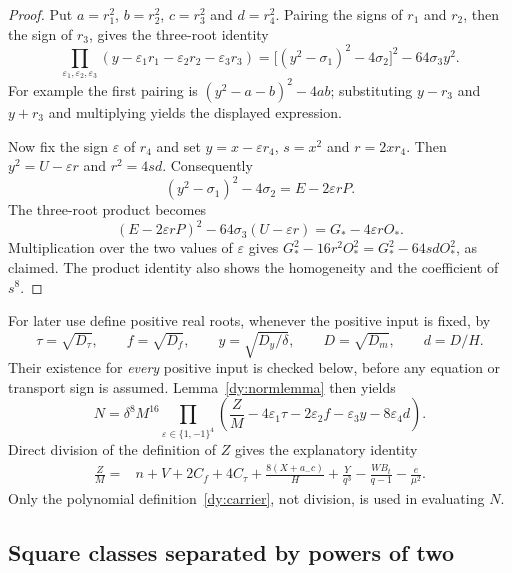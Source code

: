 \begin{proof}
Put $a=r_1^2$, $b=r_2^2$, $c=r_3^2$ and $d=r_4^2$.
Pairing the signs of $r_1$ and $r_2$, then the sign of $r_3$, gives the
three-root identity
\[
 \prod_{\varepsilon_1,\varepsilon_2,\varepsilon_3}
   (y-\varepsilon_1r_1-\varepsilon_2r_2-\varepsilon_3r_3)
 =\bigl[(y^2-\sigma_1)^2-4\sigma_2\bigr]^2
       -64\sigma_3y^2.
\]
For example the first pairing is
$(y^2-a-b)^2-4ab$; substituting $y-r_3$ and $y+r_3$ and multiplying yields
the displayed expression.

Now fix the sign $\varepsilon$ of $r_4$ and set
$y=x-\varepsilon r_4$, $s=x^2$ and $r=2xr_4$.  Then
$y^2=U-\varepsilon r$ and $r^2=4sd$.  Consequently
\[
 (y^2-\sigma_1)^2-4\sigma_2=E-2\varepsilon rP.
\]
The three-root product becomes
\[
 (E-2\varepsilon rP)^2-64\sigma_3(U-\varepsilon r)
       =G_*-4\varepsilon rO_*.
\]
Multiplication over the two values of $\varepsilon$ gives
$G_*^2-16r^2O_*^2=G_*^2-64sdO_*^2$, as claimed.  The product identity also
shows the homogeneity and the coefficient of $s^8$.
\end{proof}

For later use define positive real roots, whenever the positive input is
fixed, by
\begin{equation}
 \tau=\sqrt{D_\tau},\qquad f=\sqrt{D_f},\qquad
 y=\sqrt{D_y/\delta},\qquad D=\sqrt{D_m},\qquad d=D/H.
 \label{dy:roots}
\end{equation}
Their existence for \emph{every} positive input is checked below, before
any equation or transport sign is assumed.  Lemma~\ref{dy:normlemma}
then yields
\begin{equation}
 N=\delta^8M^{16}
    \prod_{\varepsilon\in\{1,-1\}^4}
    \left(\frac ZM-4\varepsilon_1\tau-2\varepsilon_2f
                       -\varepsilon_3y-8\varepsilon_4d\right).
 \label{dy:factorization}
\end{equation}
Direct division of the definition of $Z$ gives the explanatory identity
\begin{align}
 \frac ZM={}&n+V+2C_f+4C_\tau+\frac{8(X+a_-c)}H
       +\frac{Y}{q^3}-\frac{WB_t}{q-1}-\frac e{\mu^2}.
 \label{dy:carrieridentity}
\end{align}
Only the polynomial definition~\eqref{dy:carrier}, not division, is used
in evaluating $N$.

\subsection{Square classes separated by powers of two}
\label{dy:separation}

